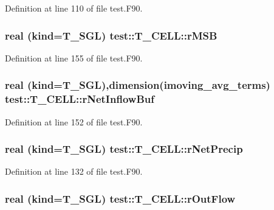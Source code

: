 Definition at line 110 of file test.F90.

\hypertarget{typetest_1_1_t___c_e_l_l_ad66f407f53e632d6081cd8ee2fa1d435}{
\subsubsection[{rMSB}]{\setlength{\rightskip}{0pt plus 5cm}real (kind={\bf T\_\-SGL}) {\bf test::T\_\-CELL::rMSB}}}
\label{typetest_1_1_t___c_e_l_l_ad66f407f53e632d6081cd8ee2fa1d435}


Definition at line 155 of file test.F90.

\hypertarget{typetest_1_1_t___c_e_l_l_ac5a0039d22d608a6b1c9f52941518668}{
\subsubsection[{rNetInflowBuf}]{\setlength{\rightskip}{0pt plus 5cm}real (kind={\bf T\_\-SGL}),dimension(imoving\_\-avg\_\-terms) {\bf test::T\_\-CELL::rNetInflowBuf}}}
\label{typetest_1_1_t___c_e_l_l_ac5a0039d22d608a6b1c9f52941518668}


Definition at line 152 of file test.F90.

\hypertarget{typetest_1_1_t___c_e_l_l_a654e179184010e5c53d45db26bc398e9}{
\subsubsection[{rNetPrecip}]{\setlength{\rightskip}{0pt plus 5cm}real (kind={\bf T\_\-SGL}) {\bf test::T\_\-CELL::rNetPrecip}}}
\label{typetest_1_1_t___c_e_l_l_a654e179184010e5c53d45db26bc398e9}


Definition at line 132 of file test.F90.

\hypertarget{typetest_1_1_t___c_e_l_l_a882393c9d8cd06b9a5f634439721505b}{
\subsubsection[{rOutFlow}]{\setlength{\rightskip}{0pt plus 5cm}real (kind={\bf T\_\-SGL}) {\bf test::T\_\-CELL::rOutFlow}}}
\label{typetest_1_1_t___c_e_l_l_a882393c9d8cd06b9a5f634439721505b}


